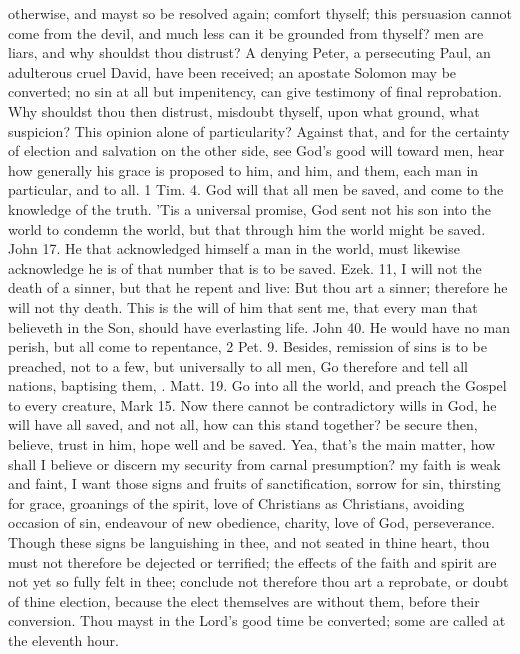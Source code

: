 {otherwise, and mayst so be resolved again; comfort thyself; this
persuasion cannot come from the devil, and much less can it be grounded
from thyself? men are liars, and why shouldst thou distrust? A denying
Peter, a persecuting Paul, an adulterous cruel David, have been
received; an apostate Solomon may be converted; no sin at all but
impenitency, can give testimony of final reprobation. Why shouldst thou
then distrust, misdoubt thyself, upon what ground, what suspicion? This
opinion alone of particularity? Against that, and for the certainty of
election and salvation on the other side, see God's good will toward
men, hear how generally his grace is proposed to him, and him, and
them, each man in particular, and to all. 1 Tim.  4. God will that
all men be saved, and come to the knowledge of the truth. 'Tis a
universal promise, God sent not his son into the world to condemn the
world, but that through him the world might be saved. John  17. He
that acknowledged himself a man in the world, must likewise acknowledge
he is of that number that is to be saved. Ezek.  11, I will not
the death of a sinner, but that he repent and live: But thou art a
sinner; therefore he will not thy death. This is the will of him that
sent me, that every man that believeth in the Son, should have
everlasting life. John  40. He would have no man perish, but all
come to repentance, 2 Pet.  9. Besides, remission of sins is to be
preached, not to a few, but universally to all men, Go therefore and
tell all nations, baptising them, \etc{}. Matt.  19. Go into all the
world, and preach the Gospel to every creature, Mark  15. Now there
cannot be contradictory wills in God, he will have all saved, and not
all, how can this stand together? be secure then, believe, trust in
him, hope well and be saved. Yea, that's the main matter, how shall I
believe or discern my security from carnal presumption? my faith is
weak and faint, I want those signs and fruits of sanctification,
sorrow for sin, thirsting for grace, groanings of the spirit,
love of Christians as Christians, avoiding occasion of sin, endeavour
of new obedience, charity, love of God, perseverance. Though these
signs be languishing in thee, and not seated in thine heart, thou must
not therefore be dejected or terrified; the effects of the faith and
spirit are not yet so fully felt in thee; conclude not therefore thou
art a reprobate, or doubt of thine election, because the elect
themselves are without them, before their conversion. Thou mayst in the
Lord's good time be converted; some are called at the eleventh hour.

}
